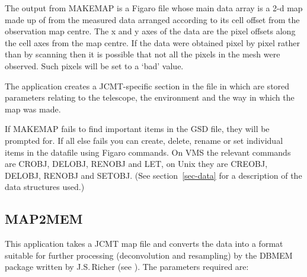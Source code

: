 \documentclass[twoside,11pt]{article}
\newcommand{\xlabel}[1]{}
\renewcommand{\_}{\texttt{\symbol{95}}}
\begin{document}
\goodbreak

The output from MAKEMAP is a Figaro file whose main data array is a
2-d map made up of from the measured data arranged according to its
cell offset from the observation map centre. The x and y axes of the
data are the pixel offsets along the cell axes from the map centre. If
the data were obtained pixel by pixel rather than by scanning then it
is possible that not all the pixels in the mesh were observed. Such
pixels will be set to a `bad' value.

The application creates a JCMT-specific section in the file in which
are stored parameters relating to the telescope, the environment and
the way in which the map was made. 

If MAKEMAP fails to find important items in the GSD file, they will be 
prompted for. If all else fails you can create, delete, rename or set
individual items in the datafile using Figaro commands.
On VMS the relevant commands are CROBJ, DELOBJ, RENOBJ and LET, on Unix
they are CREOBJ, DELOBJ, RENOBJ and SETOBJ.
(See section~\ref{sec-data} for a description
of the data structures used.)


\goodbreak

\subsection {\xlabel{MAP2MEM}MAP2MEM}

This application takes a JCMT map file and converts the data into a format
suitable for further processing (deconvolution and resampling) by the DBMEM
package written by J.S.\,Richer (see \cite{dbmem}). The parameters required
are:

\goodbreak
\end{document}
